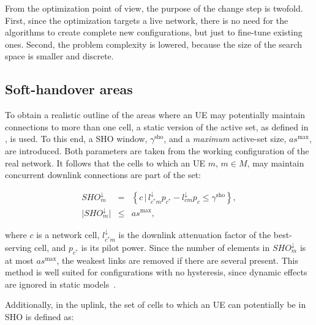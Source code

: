 From the optimization point of view, the purpose of the change step
is twofold. First, since the optimization targets a live network,
there is no need for the algorithms to create complete new configurations,
but just to fine-tune existing ones. Second, the problem complexity
is lowered, because the size of the search space is smaller and discrete.


\subsection{Soft-handover areas \label{sub:07-SHO_areas}}

To obtain a realistic outline of the areas where an UE may potentially
maintain connections to more than one cell, a static version of the
active set, as defined in \cite{nawrocki2006understanding}, is used.
To this end, a SHO window, $\gamma^{\mathrm{sho}}$,
and a \textit{\emph{maximum}} active-set size, $as^{\mathrm{max}}$,
are introduced. Both parameters are taken from the working configuration
of the real network. It follows that the cells to which an UE $m$,
$m\in M$, may maintain concurrent downlink connections are part of
the set:

\begin{eqnarray}
SHO_{m}^{\downarrow} & = & \left\{ c\,\vert\, l_{c^{*}m}^{\downarrow}p_{c^{*}}-l_{cm}^{\downarrow}p_{c}\le\gamma^{\mathrm{sho}}\right\} ,\nonumber \\
\vert SHO_{m}^{\downarrow}\vert & \le & as^{\mathrm{max}},
\end{eqnarray}



\noindent where $c$ is a network cell, $l_{c^{*}m}^{\downarrow}$
is the downlink attenuation factor of the best-serving cell, and $p_{c^{*}}$
is its pilot power. Since the number of elements in $SHO_{m}^{\downarrow}$
is at most $as^{\mathrm{max}}$, the weakest links are removed if
there are several present. This method is well suited for configurations
with no hysteresis, since dynamic effects are ignored in static models~\cite{nawrocki2006understanding}. 

Additionally, in the uplink, the set of cells to which an UE can potentially
be in SHO is defined as:

